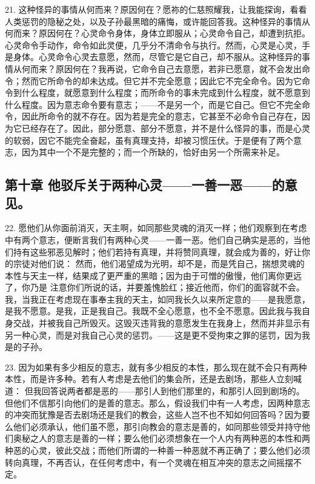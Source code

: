 21. 这种怪异的事情从何而来？原因何在？愿祢的仁慈照耀我，让我能探询，看看人类惩罚的隐秘之处，以及子孙最黑暗的痛悔，或许能回答我。这种怪异的事情从何而来？原因何在？心灵命令身体，身体立即服从；心灵命令自己，却遭到抗拒。心灵命令手动作，命令如此灵便，几乎分不清命令与执行。然而，心灵是心灵，手是身体。心灵命令心灵去意愿，然而，尽管它是它自己，却不服从。这种怪异的事情从何而来？原因何在？我再说，它命令自己去意愿，若非已愿意，就不会发出命令；然而它所命令的却未达成。但它并不完全愿意；因此它不完全命令。因为它命令到什么程度，就愿意到什么程度；而所命令的事未完成到什么程度，就不愿意到什么程度。因为意志命令要有意志；——不是另一个，而是它自己。但它不完全命令，因此所命令的就不存在。因为若是完全的意志，它甚至不必命令自己存在，因为它已经存在了。因此，部分愿意、部分不愿意，并不是什么怪异的事，而是心灵的软弱，因它不能完全奋起，虽有真理支持，却被习惯压伏。于是便有了两个意志，因为其中一个不是完整的；而一个所缺的，恰好由另一个所需来补足。\par


\subsection{第十章 他驳斥关于两种心灵——一善一恶——的意见。}

22. 愿他们从你面前消灭，天主啊，如同那些灵魂的消灭一样；他们观察到在考虑中有两个意志，便断言我们有两种心灵——一善一恶。他们自己确实是恶的，当他们持有这些邪恶见解时；他们若持有真理，并将赞同真理，就会成为善的，好让你的宗徒对他们说： 然而，他们渴望成为光明，却不是，而是凭自己，揣想灵魂的本性与天主一样，结果成了更严重的黑暗；因为由于可憎的傲慢，他们离你更远了，你乃是 注意你们所说的话，并要羞愧脸红；接近他而，你们的面容就不会。我，当我正在考虑现在事奉主我的天主，如同我长久以来所定意的——是我愿意，是我不愿意。是我，正是我自己。我既不全心愿意，也不全不愿意。因此我与我自身交战，并被我自己所毁灭。这毁灭违背我的意愿发生在我身上，然而并非显示有另一种心灵，而是对我自己心灵的惩罚。——这是更不受拘束之罪的惩罚，因为我是的子孙。\par

23. 因为如果有多少相反的意志，就有多少相反的本性，那么现在就不会只有两种本性，而是许多种。若有人考虑是去他们的集会所，还是去剧场，那些人立刻喊道： 但我回答说两者都是恶的——那引人到他们那里的，和那引人回到剧场的。但他们不信那引向他们的是善的意志。那么，假设我们中有一人考虑，因两种意志的冲突而犹豫是否去剧场还是我们的教会，这些人岂不也不知如何回答吗？因为要么他们必须承认，他们虽不愿，那引向教会的意志是善的，如同那些领受并持守他们奥秘之人的意志是善的一样；要么他们必须想象在一个人内有两种恶的本性和两种恶的心灵，彼此交战；而他们所谓的一种善一种恶就不再正确了；要么他们必须转向真理，不再否认，在任何考虑中，有一个灵魂在相互冲突的意志之间摇摆不定。\par

